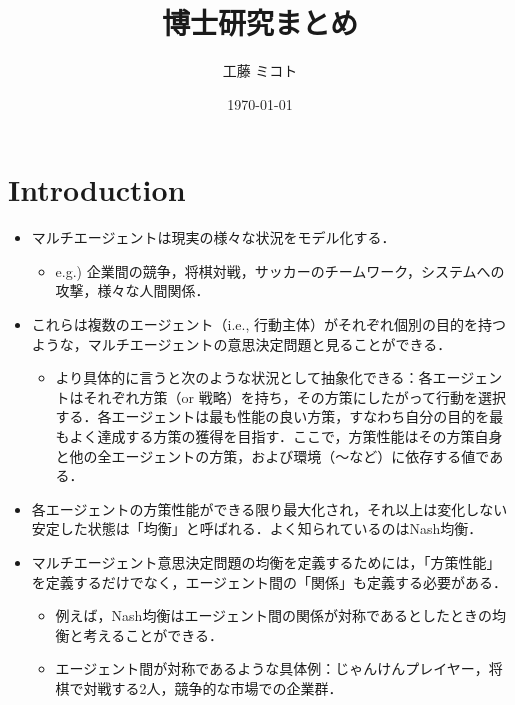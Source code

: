 \documentclass[a4paper,10pt,dvipdfmx]{jsarticle}
\title{博士研究まとめ}
\date{\today}
\author{工藤 ミコト}
\begin{document}
\maketitle

\begin{abstract}
\end{abstract}

\tableofcontents %

\section{Introduction}

\begin{itemize}
    \item マルチエージェントは現実の様々な状況をモデル化する．
    \begin{itemize}
        \item e.g.) 企業間の競争，将棋対戦，サッカーのチームワーク，システムへの攻撃，様々な人間関係．
    \end{itemize}
    \item これらは複数のエージェント（i.e., 行動主体）がそれぞれ個別の目的を持つような，マルチエージェントの意思決定問題と見ることができる．
    \begin{itemize}
        \item より具体的に言うと次のような状況として抽象化できる：各エージェントはそれぞれ方策（or 戦略）を持ち，その方策にしたがって行動を選択する．各エージェントは最も性能の良い方策，すなわち自分の目的を最もよく達成する方策の獲得を目指す．ここで，方策性能はその方策自身と他の全エージェントの方策，および環境（〜など）に依存する値である．
    \end{itemize}
    \item 各エージェントの方策性能ができる限り最大化され，それ以上は変化しない安定した状態は「均衡」と呼ばれる．よく知られているのはNash均衡．
    \item マルチエージェント意思決定問題の均衡を定義するためには，「方策性能」を定義するだけでなく，エージェント間の「関係」も定義する必要がある．
    \begin{itemize}
        \item 例えば，Nash均衡はエージェント間の関係が対称であるとしたときの均衡と考えることができる．
        \item エージェント間が対称であるような具体例：じゃんけんプレイヤー，将棋で対戦する2人，競争的な市場での企業群．

\end{itemize}
\end{itemize}
\end{document}
